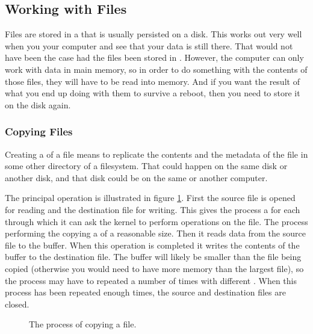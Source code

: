 \subsection{Working with Files}

Files are stored in a  that is usually persisted on a disk. This works out very well when you  your computer and see that your data is still there. That would not have been the case had the files been stored in . However, the computer can only work with data in main memory, so in order to do something with the contents of those files, they will have to be read into memory. And if you want the result of what you end up doing with them to survive a reboot, then you need to store it on the disk again.

\subsubsection{Copying Files}

Creating a  of a file means to replicate the contents and the metadata of the file in some other directory of a filesystem. That could happen on the same disk or another disk, and that disk could be on the same or another computer.

The principal operation is illustrated in figure \ref{fig:bg:processes:copy}. First the source file is opened for reading and the destination file for writing. This gives the process a  for each through which it can ask the kernel to perform operations on the file. The process performing the copying  a  of a reasonable size. Then it reads data from the source file to the buffer. When this operation is completed it writes the contents of the buffer to the destination file. The buffer will likely be smaller than the file being copied (otherwise you would need to have more memory than the largest file), so the process may have to repeated a number of times with different . When this process has been repeated enough times, the source and destination files are closed.

\begin{figure}[tbp]
  
  \caption{The process of copying a file.}
  \label{fig:bg:processes:copy}
\end{figure}

